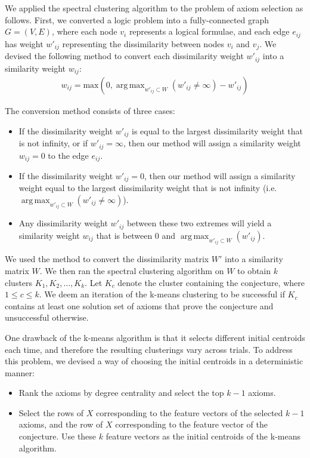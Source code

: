 \documentclass[EPiC]{easychair}
\DeclareMathOperator*{\argmaxA}{arg\,max} %
\begin{document}
We applied the spectral clustering algorithm to the problem of axiom 
selection as follows. First, we converted a logic problem into a 
fully-connected graph $G = (V, E)$, where each node $v_{i}$ represents a 
logical formulae, and each edge $e_{ij}$ has weight $w'_{ij}$ representing 
the dissimilarity between nodes $v_{i}$ and $v_{j}$. We devised the following 
method to convert each dissimilarity weight $w'_{ij}$ into a similarity 
weight $w_{ij}$:
\begin{align}
w_{ij} = \textrm{max}(0, 
	\argmaxA_{w'_{ij} \subset W} (w'_{ij} \neq \infty) - w'_{ij})
\end{align}

The conversion method consists of three cases:
\begin{itemize}
\item If the dissimilarity weight $w'_{ij}$ is equal to the largest 
dissimilarity weight that is not infinity, or if $w'_{ij} = \infty$, then 
our method will assign a similarity weight $w_{ij} = 0$ to the edge $e_{ij}$.

\item If the dissimilarity weight $w'_{ij} = 0$, then our method will assign 
a similarity weight equal to the largest dissimilarity weight that is not 
infinity (i.e. $\argmaxA_{w'_{ij} \subset W} (w'_{ij} \neq \infty)$).

\item Any dissimilarity weight $w'_{ij}$ between these two extremes will 
yield a similarity weight $w_{ij}$ that is between 
$0$ and $\argmaxA_{w'_{ij} \subset W} (w'_{ij})$.
\end{itemize}

We used the method to convert the dissimilarity matrix $W'$ into a similarity
matrix $W$. We then ran the spectral clustering algorithm on $W$ 
to obtain $k$ clusters $K_{1}, K_{2}, ..., K_{k}$. Let $K_{c}$ denote the 
cluster containing the conjecture, where $1 \leq c \leq k$. We deem an
iteration of the k-means clustering to be successful if $K_{c}$ contains at 
least one solution set of axioms that prove the conjecture and unsuccessful 
otherwise.

One drawback of the k-means algorithm is that it selects different initial 
centroids each time, and therefore the resulting clusterings vary across 
trials. To address this problem, we devised a way of choosing the initial 
centroids in a deterministic manner:
\begin{itemize}
\item Rank the axioms by degree centrality and select the top $k-1$ axioms.
\item Select the rows of $X$ corresponding to the feature vectors of the
selected $k-1$ axioms, and the row of $X$ corresponding to the feature vector 
of the conjecture. Use these $k$ feature vectors as the initial centroids of 
the k-means algorithm. 
\end{itemize}
\end{document}
